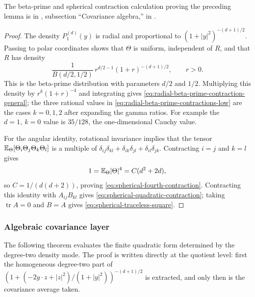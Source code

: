 \ifdefined\JFAArticleMain
The beta-prime and spherical contraction calculation proving the preceding
lemma is in , subsection ``Covariance
algebra,'' in .
\else
\begin{proof}
The density \(P_1^{(d)}(y)\) is radial and proportional to
\((1+|y|^2)^{-(d+1)/2}\).  Passing to polar coordinates shows that
\(\Theta\) is uniform, independent of \(R\), and that \(R\) has density
\[
\frac{1}{B(d/2,1/2)}\,r^{d/2-1}(1+r)^{-(d+1)/2},
\qquad r>0.
\]
This is the beta-prime distribution with parameters \(d/2\) and \(1/2\).
Multiplying this density by \(r^k(1+r)^{-4}\) and integrating gives
\eqref{eq:radial-beta-prime-contraction-general}; the three rational values
in \eqref{eq:radial-beta-prime-contractions-low} are the cases
\(k=0,1,2\) after expanding the gamma ratios.  For example the
\(d=1,\ k=0\) value is \(35/128\), the one-dimensional Cauchy value.

For the angular identity, rotational invariance implies that the tensor
\(\mathbb{E}_\Theta[\Theta_i\Theta_j\Theta_k\Theta_l]\) is a multiple of
\(\delta_{ij}\delta_{kl}+\delta_{ik}\delta_{jl}+\delta_{il}\delta_{jk}\).
Contracting \(i=j\) and \(k=l\) gives
\[
1=\mathbb{E}_\Theta|\Theta|^4=C(d^2+2d),
\]
so \(C=1/(d(d+2))\), proving
\eqref{eq:spherical-fourth-contraction}.  Contracting this identity with
\(A_{ij}B_{kl}\) gives \eqref{eq:spherical-quadratic-contraction}; taking
\(\operatorname{tr}A=0\) and \(B=A\) gives
\eqref{eq:spherical-traceless-square}.
\end{proof}
\fi

\subsubsection*{Algebraic covariance layer}\leavevmode\par\smallskip

The following theorem evaluates the finite quadratic form determined by the
degree-two density mode.  The proof is written directly at the quotient level:
first the homogeneous degree-two part of
\((1+(-2y\cdot z+|z|^2)/(1+|y|^2))^{-(d+1)/2}\) is extracted, and only then
is the covariance average taken.

